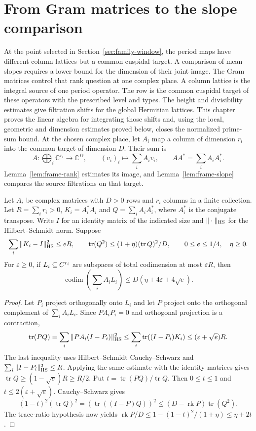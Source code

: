 \section{From Gram matrices to the slope comparison}\label{sec:frames}
\hypertarget{source-frames}{}

At the point selected in Section~\ref{sec:family-window}, the period maps have different column lattices but a common cuspidal target. A comparison of mean slopes requires a lower bound for the dimension of their joint image. The Gram matrices control that rank question at one
complex place. A column lattice is the integral source of
one period operator. The row is the common cuspidal target
of these operators with the prescribed level and types.
The height and divisibility estimates give
filtration shifts for the global Hermitian lattices. This chapter
proves the linear algebra for integrating those shifts and,
using the local, geometric and dimension estimates proved
below, closes the normalized prime-sum bound. At the chosen complex place, let \(A_i\) map a column of dimension \(r_i\) into the common target of dimension \(D\). Their sum is
\[
 A:\bigoplus_i\mathbb C^{r_i}\longrightarrow\mathbb C^D,\qquad
 (v_i)_i\longmapsto\sum_i A_i v_i,\qquad AA^*=\sum_i A_i A_i^* .
\]
Lemma~\ref{lem:frame-rank} estimates its image, and
Lemma~\ref{lem:frame-slope} compares the source filtrations on that target.

\begin{lemma}\label{lem:frame-rank}
Let \(A_i\) be complex matrices with \(D>0\) rows and \(r_i\)
columns in a finite collection. Let \(R=\sum_i r_i>0\),
\(K_i=A_i^*A_i\) and \(Q=\sum_i A_iA_i^*\), where \(A_i^*\)
is the conjugate transpose. Write \(I\) for an identity
matrix of the indicated size and \(\|\cdot\|_{\rm HS}\)
for the Hilbert--Schmidt norm. Suppose
\[
 \sum_i\|K_i-I\|_{\rm HS}^2\le eR,\qquad
 \operatorname{tr}(Q^2)\le(1+\eta)(\operatorname{tr}Q)^2/D,
 \qquad 0\le e\le1/4,\quad \eta\ge0.
\]
For \(\varepsilon\ge0\), if \(L_i\subseteq C^{r_i}\) are
subspaces of total codimension
at most \(\varepsilon R\), then
\[
 \operatorname{codim}\left(\sum_i A_iL_i\right)
          \le D(\eta+4\varepsilon+4\sqrt e).
\]
\end{lemma}

\begin{proof}
Let \(P_i\) project orthogonally onto \(L_i\) and let \(P\) project
onto the orthogonal complement of \(\sum_i A_iL_i\).
Since \(PA_iP_i=0\) and orthogonal projection is a contraction,
\[
 \operatorname{tr}(PQ)=\sum_i\|PA_i(I-P_i)\|_{\rm HS}^2
 \le \sum_i\operatorname{tr}((I-P_i)K_i)
 \le(\varepsilon+\sqrt e)R.
\]
The last inequality uses Hilbert--Schmidt Cauchy--Schwarz and
\(\sum_i\|I-P_i\|_{\rm HS}^2\le R\). Applying the same estimate
with the identity matrices gives
\(\operatorname{tr}Q\ge (1-\sqrt e)R\ge R/2\).
Put \(t=\operatorname{tr}(PQ)/\operatorname{tr}Q\).
Then \(0\le t\le1\) and \(t\le2(\varepsilon+\sqrt e)\).
Cauchy--Schwarz gives
\[
 (1-t)^2(\operatorname{tr}Q)^2
  =(\operatorname{tr}((I-P)Q))^2
  \le (D-\operatorname{rk}P)\operatorname{tr}(Q^2).
\]
The trace-ratio hypothesis now yields
\(\operatorname{rk}P/D\le 1-(1-t)^2/(1+\eta)\le\eta+2t\).
\end{proof}

